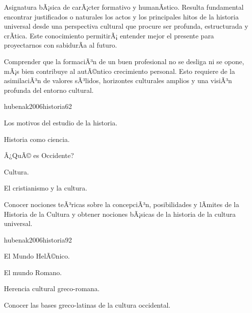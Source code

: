 \begin{syllabus}


\begin{justification}
Asignatura bÃ¡sica de carÃ¡cter formativo y humanÃ­stico. Resulta fundamental encontrar justificados o naturales los actos y los principales hitos de la historia universal desde una perspectiva cultural que procure ser profunda, estructurada y crÃ­tica. Este conocimiento permitirÃ¡ entender mejor el presente para proyectarnos con sabidurÃ­a al futuro.
\end{justification}

\begin{goals}
\item Comprender que la formaciÃ³n de un buen profesional no se desliga ni se opone, mÃ¡s bien contribuye al autÃ©ntico crecimiento personal. Esto requiere de la asimilaciÃ³n de valores sÃ³lidos, horizontes culturales amplios y una visiÃ³n profunda del entorno cultural.
\end{goals}

\begin{outcomes}
\end{outcomes}

\begin{unit}{}{hubenak2006historia}{6}{2}
\begin{topics}
	\item Los motivos del estudio de la historia. 	
	\item Historia como ciencia. 	
	\item Â¿QuÃ© es Occidente? 	
	\item Cultura. 	
	\item El cristianismo y la cultura. 
\end{topics}
\begin{unitgoals}
	\item Conocer nociones teÃ³ricas sobre la concepciÃ³n, posibilidades y lÃ­mites de la Historia de la Cultura y obtener nociones bÃ¡sicas de la historia de la cultura universal.
\end{unitgoals}
\end{unit}

\begin{unit}{}{hubenak2006historia}{9}{2}
\begin{topics}
	\item El Mundo HelÃ©nico. 	
	\item El mundo Romano. 	
	\item Herencia cultural greco-romana. 
\end{topics}
\begin{unitgoals}
	\item Conocer las bases greco-latinas de la cultura occidental.
\end{unitgoals}
\end{unit}


\end{syllabus}
